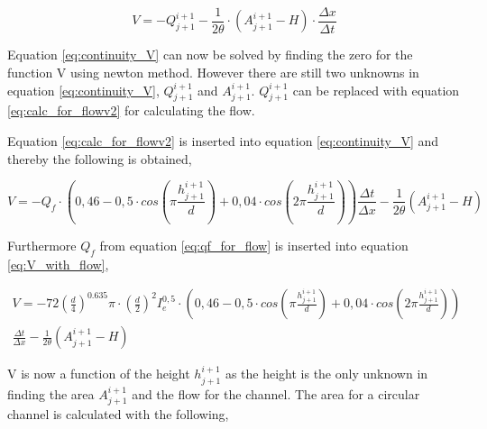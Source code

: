 \begin{equation}\label{eq:continuity_V}
		V=-Q_{j+1}^{i+1}  - \frac{1}{2\theta}\cdot\left(A_{j+1}^{i+1}-H\right)\cdot \frac{\Delta x}{\Delta t}
\end{equation}

Equation \ref{eq:continuity_V} can now be solved by finding the zero for the function V using newton method. However there are still two unknowns in equation \ref{eq:continuity_V}, $Q_{j+1}^{i+1}$ and $A_{j+1}^{i+1}$. $Q_{j+1}^{i+1}$ can be replaced with equation \ref{eq:calc_for_flowv2} for calculating the flow.

Equation \ref{eq:calc_for_flowv2} is inserted into equation \ref{eq:continuity_V} and thereby the following is obtained,

\begin{equation}\label{eq:V_with_flow}
	V = -Q_f\cdot\left(0,46-0,5\cdot cos\left(\pi \frac{h_{j+1}^{i+1}}{d}\right)+0,04\cdot cos\left(2\pi\frac{h_{j+1}^{i+1}}{d}\right)\right)\frac{\Delta t}{\Delta x}-\frac{1}{2\theta}\left(A_{j+1}^{i+1}-H\right)
\end{equation}

Furthermore $Q_f$ from equation \ref{eq:qf_for_flow} is inserted into equation \ref{eq:V_with_flow},

\begin{multline}\label{eq:new_continuity_equation}
	V = -72\left(\frac{d}{4}\right)^{0.635}\pi\cdot\left(\frac{d}{2}\right)^2I_e^{0,5}\cdot \left(0,46-0,5\cdot cos\left(\pi \frac{h_{j+1}^{i+1}}{d}\right)+ 0,04\cdot cos\left(2\pi\frac{h_{j+1}^{i+1}}{d}\right)\right)\\ \frac{\Delta t}{\Delta x}-\frac{1}{2\theta}\left(A_{j+1}^{i+1}-H\right)
\end{multline}

V is now a function of the height $h_{j+1}^{i+1}$ as the height is the only unknown in finding the area $A_{j+1}^{i+1}$ and the flow for the channel. The area for a circular channel is calculated with the following,

